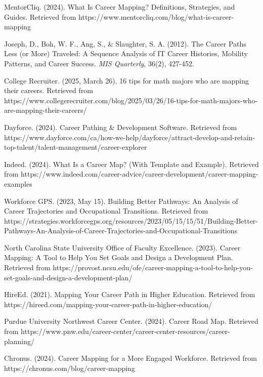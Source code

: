 \documentclass{article}
\begin{document}

\begin{thebibliography}{99}

MentorCliq. (2024). What Is Career Mapping? Definitions, Strategies, and Guides. Retrieved from https://www.mentorcliq.com/blog/what-is-career-mapping

Joseph, D., Boh, W. F., Ang, S., \& Slaughter, S. A. (2012). The Career Paths Less (or More) Traveled: A Sequence Analysis of IT Career Histories, Mobility Patterns, and Career Success. \textit{MIS Quarterly}, 36(2), 427-452.

College Recruiter. (2025, March 26). 16 tips for math majors who are mapping their careers. Retrieved from https://www.collegerecruiter.com/blog/2025/03/26/16-tips-for-math-majors-who-are-mapping-their-careers/

Dayforce. (2024). Career Pathing \& Development Software. Retrieved from https://www.dayforce.com/ca/how-we-help/dayforce/attract-develop-and-retain-top-talent/talent-management/career-explorer

Indeed. (2024). What Is a Career Map? (With Template and Example). Retrieved from https://www.indeed.com/career-advice/career-development/career-mapping-examples

Workforce GPS. (2023, May 15). Building Better Pathways: An Analysis of Career Trajectories and Occupational Transitions. Retrieved from https://strategies.workforcegps.org/resources/2023/05/15/15/51/Building-Better-Pathways-An-Analysis-of-Career-Trajectories-and-Occupational-Transitions

North Carolina State University Office of Faculty Excellence. (2023). Career Mapping: A Tool to Help You Set Goals and Design a Development Plan. Retrieved from https://provost.ncsu.edu/ofe/career-mapping-a-tool-to-help-you-set-goals-and-design-a-development-plan/

HireEd. (2021). Mapping Your Career Path in Higher Education. Retrieved from https://hireed.com/mapping-your-career-path-in-higher-education/

Purdue University Northwest Career Center. (2024). Career Road Map. Retrieved from https://www.pnw.edu/career-center/career-center-resources/career-planning/

Chronus. (2024). Career Mapping for a More Engaged Workforce. Retrieved from https://chronus.com/blog/career-mapping

\end{thebibliography}
\end{document}
